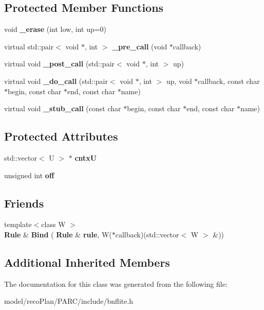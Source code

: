 \subsection*{Protected Member Functions}
\begin{DoxyCompactItemize}
\item 
\mbox{\label{classbnf_1_1___parser_a754b79ca6995630f49a825882c27236f}} 
void {\bfseries \+\_\+erase} (int low, int up=0)
\item 
\mbox{\label{classbnf_1_1___parser_a6d889544a678ade59c9c815fe0f4996a}} 
virtual std\+::pair$<$ void $\ast$, int $>$ {\bfseries \+\_\+pre\+\_\+call} (void $\ast$callback)
\item 
\mbox{\label{classbnf_1_1___parser_a9ec77b1775499d4027944409c5d76d53}} 
virtual void {\bfseries \+\_\+post\+\_\+call} (std\+::pair$<$ void $\ast$, int $>$ up)
\item 
\mbox{\label{classbnf_1_1___parser_a8a7b530150d6d1d47394ac3d722cdc45}} 
virtual void {\bfseries \+\_\+do\+\_\+call} (std\+::pair$<$ void $\ast$, int $>$ up, void $\ast$callback, const char $\ast$begin, const char $\ast$end, const char $\ast$name)
\item 
\mbox{\label{classbnf_1_1___parser_a37cb39a6c1a50c12520b3305e373e898}} 
virtual void {\bfseries \+\_\+stub\+\_\+call} (const char $\ast$begin, const char $\ast$end, const char $\ast$name)
\end{DoxyCompactItemize}
\subsection*{Protected Attributes}
\begin{DoxyCompactItemize}
\item 
\mbox{\label{classbnf_1_1___parser_a3f445fa7138af0c8636db4ff88d3e810}} 
std\+::vector$<$ U $>$ $\ast$ {\bfseries cntxU}
\item 
\mbox{\label{classbnf_1_1___parser_a02e8109a611bf1157929b5c90df08a06}} 
unsigned int {\bfseries off}
\end{DoxyCompactItemize}
\subsection*{Friends}
\begin{DoxyCompactItemize}
\item 
\mbox{\label{classbnf_1_1___parser_ad8e6fd2316a4d552ad378a676daf243b}} 
{\footnotesize template$<$class W $>$ }\\\textbf{ Rule} \& {\bfseries Bind} (\textbf{ Rule} \&\textbf{ rule}, W($\ast$callback)(std\+::vector$<$ W $>$ \&))
\end{DoxyCompactItemize}
\subsection*{Additional Inherited Members}


The documentation for this class was generated from the following file\+:\begin{DoxyCompactItemize}
\item 
model/reco\+Plan/\+P\+A\+R\+C/include/bnflite.\+h\end{DoxyCompactItemize}
